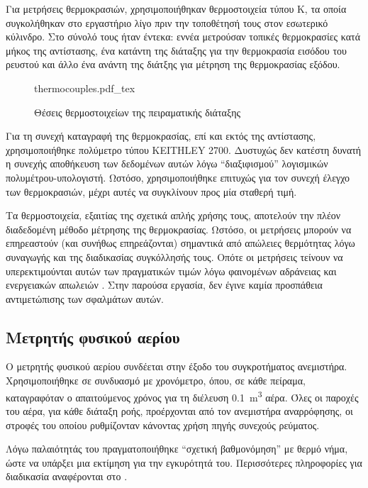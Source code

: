 \noindent Για μετρήσεις θερμοκρασιών, χρησιμοποιήθηκαν θερμοστοιχεία τύπου Κ, τα οποία συγκολήθηκαν στο εργαστήριο λίγο πριν την τοποθέτησή τους στον εσωτερικό κύλινδρο. Στο σύνολό τους ήταν έντεκα: εννέα μετρούσαν τοπικές θερμοκρασίες κατά μήκος της αντίστασης, ένα κατάντη της διάταξης για την θερμοκρασία εισόδου του ρευστού και άλλο ένα ανάντη της διάτξης για μέτρηση της θερμοκρασίας εξόδου.

\begin{figure}[h!]
\centering
{thermocouples.pdf_tex}
\caption{Θέσεις θερμοστοιχείων της πειραματικής διάταξης}
\end{figure}

Για τη συνεχή καταγραφή της θερμοκρασίας, επί και εκτός της αντίστασης, χρησιμοποιήθηκε πολύμετρο τύπου KEITHLEY 2700. Δυστυχώς δεν κατέστη δυνατή η συνεχής αποθήκευση των δεδομένων αυτών λόγω \enquote{διαξιφισμού} λογισμικών πολυμέτρου-υπολογιστή. Ωστόσο, χρησιμοποιήθηκε επιτυχώς για τον συνεχή έλεγχο των θερμοκρασιών, μέχρι αυτές να συγκλίνουν προς μία σταθερή τιμή. 

Τα θερμοστοιχεία, εξαιτίας της σχετικά απλής χρήσης τους, αποτελούν την πλέον διαδεδομένη μέθοδο μέτρησης της θερμοκρασίας. Ωστόσο, οι μετρήσεις μπορούν να επηρεαστούν (και συνήθως επηρεάζονται) σημαντικά από απώλειες θερμότητας λόγω συναγωγής και της διαδικασίας συγκόλλησής τους. Οπότε οι μετρήσεις τείνουν να υπερεκτιμούνται αυτών των πραγματικών τιμών λόγω φαινομένων αδράνειας και ενεργειακών απωλειών \cite{1994_FluidDynamicsRhodeSaintGenese_BOOK}. Στην παρούσα εργασία, δεν έγινε καμία προσπάθεια αντιμετώπισης των σφαλμάτων αυτών.

\subsection{Μετρητής φυσικού αερίου}

\noindent Ο μετρητής φυσικού αερίου συνδέεται στην έξοδο του συγκροτήματος ανεμιστήρα. Χρησιμοποιήθηκε σε συνδυασμό με χρονόμετρο, όπου, σε κάθε πείραμα, καταγραφόταν ο απαιτούμενος χρόνος για τη διέλευση \qty{0.1}{\metre\cubed} αέρα. Όλες οι παροχές του αέρα, για κάθε διάταξη ροής, προέρχονται από τον ανεμιστήρα αναρρόφησης, οι στροφές του οποίου ρυθμίζονταν κάνοντας χρήση πηγής συνεχούς ρεύματος.

Λόγω παλαιότητάς του πραγματοποιήθηκε \enquote{σχετική βαθμονόμηση} με θερμό νήμα, ώστε να υπάρξει μια εκτίμηση για την εγκυρότητά του. Περισσότερες πληροφορίες για διαδικασία αναφέρονται στο .

